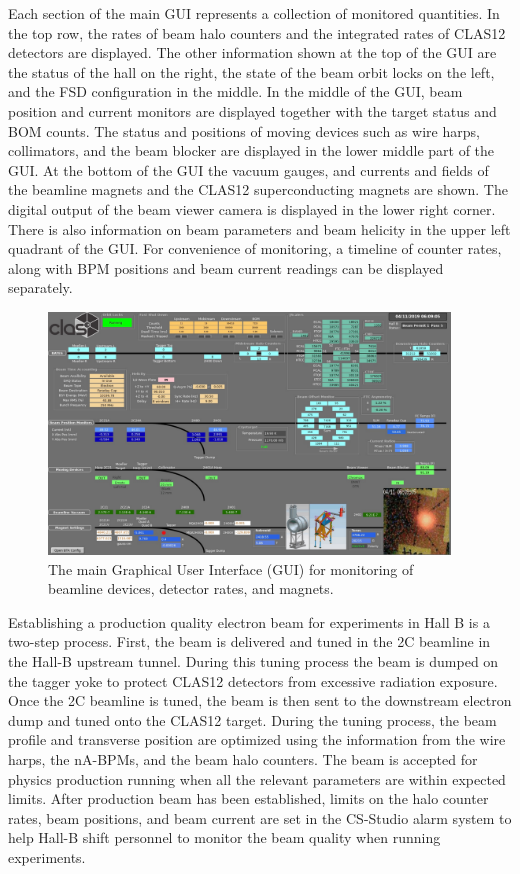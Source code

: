 Each section of the main GUI represents a collection of monitored quantities. In the top row, the rates of beam halo counters and the 
integrated rates of CLAS12 detectors are displayed. The other information shown at the top of the GUI are the status of the hall on 
the right, the state of the beam orbit locks on the left, and the FSD configuration in the middle. In the middle of the GUI, beam position 
and current monitors are displayed together with the target status and BOM counts.  The status and positions of moving devices such 
as wire harps, collimators, and the beam blocker are displayed in the lower middle part of the GUI. At the bottom of the GUI the vacuum 
gauges, and currents and fields of the beamline magnets and the CLAS12 superconducting magnets are shown. The digital output of the 
beam viewer camera is displayed in the lower right corner. There is also information on beam parameters and beam helicity in the upper left 
quadrant of the GUI. For convenience of monitoring, a timeline of counter rates, along with BPM positions and beam current readings can 
be displayed separately.  

\begin{figure}[t]
\begin{center}
\includegraphics[width=0.95\textwidth]{main_gui.pdf}
	\caption{The main Graphical User Interface (GUI) for monitoring of beamline devices, detector rates, and magnets.}
\label{fig:mgui}
\end{center}
\end{figure}



Establishing a production quality electron beam for experiments in Hall B is a two-step process. First, the beam is delivered and tuned in 
the 2C beamline in the Hall-B upstream tunnel. During this tuning process the beam is dumped on the tagger yoke to protect CLAS12 
detectors from excessive radiation exposure. Once the 2C beamline is tuned, the beam is then sent to the downstream electron dump and 
tuned onto the CLAS12 target. During the tuning process, the beam profile and transverse position are optimized using the information from 
the wire harps, the nA-BPMs, and the beam halo counters.  The beam is accepted for physics production running when all the relevant 
parameters are within expected limits. After production beam has been established,  limits on the halo counter rates, beam positions, and 
beam current are set in the CS-Studio alarm system to help Hall-B shift personnel to monitor the beam quality when running experiments.  


